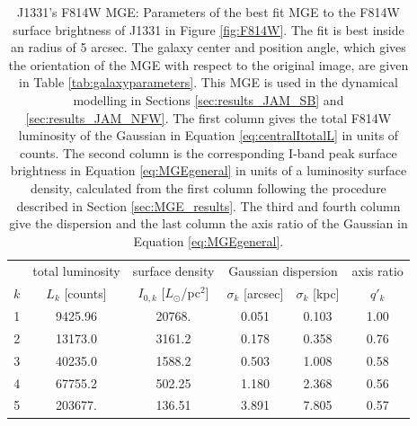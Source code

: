 \begin{table}
\centering
\caption{J1331's F814W MGE: Parameters of the best fit MGE to the F814W surface brightness of J1331 in Figure \ref{fig:F814W}. The fit is best inside an radius of 5 arcsec. The galaxy center and position angle, which gives the orientation of the MGE with respect to the original image, are given in Table \ref{tab:galaxyparameters}. This MGE is used in the dynamical modelling in Sections \ref{sec:results_JAM_SB} and \ref{sec:results_JAM_NFW}.  The first column gives the total F814W luminosity of the Gaussian in Equation \ref{eq:centralItotalL} in units of counts. The second column is the corresponding I-band peak surface brightness in Equation \ref{eq:MGEgeneral} in units of a luminosity surface density, calculated from the first column following the procedure described in Section \ref{sec:MGE_results}. The third and fourth column give the dispersion and the last column the axis ratio of the Gaussian in Equation \ref{eq:MGEgeneral}.}
\begin{tabular}{cccccc}
\hline
 & total luminosity  & surface density & \multicolumn{2}{c}{Gaussian dispersion} & axis ratio\\
$k$  & $L_k$ [counts] & $I_{0,k}$ [$L_\odot$/pc$^2$] & $\sigma_k$ [arcsec] & $\sigma_k$ [kpc] & $q'_k$\\\hline
1  &     9425.96 &      20768.  &  0.051   & 0.103  & 1.00\\
2  &    13173.0 &        3161.2 &  0.178   & 0.358  & 0.76\\
3  &    40235.0 &        1588.2 &  0.503   & 1.008  & 0.58\\
4  &    67755.2 &         502.25&  1.180   & 2.368  & 0.56\\
5  &    203677. &         136.51&  3.891   & 7.805  & 0.57\\\hline
\end{tabular}
\label{tab:MGEF814W}
\end{table}


